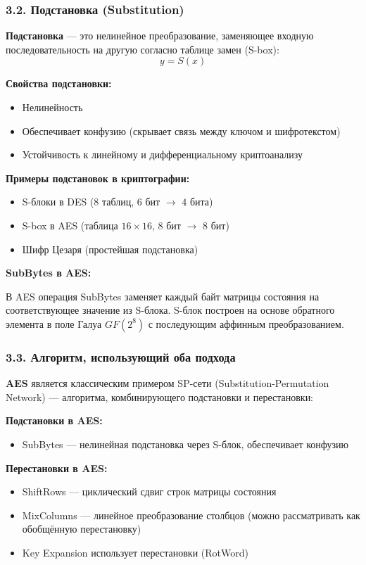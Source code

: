 \subsubsection*{3.2. Подстановка (Substitution)}

\textbf{Подстановка} — это нелинейное преобразование, заменяющее входную последовательность на другую согласно таблице замен (S-box):
$$y = S(x)$$

\textbf{Свойства подстановки:}
\begin{itemize}
    \item Нелинейность
    \item Обеспечивает конфузию (скрывает связь между ключом и шифротекстом)
    \item Устойчивость к линейному и дифференциальному криптоанализу
\end{itemize}

\textbf{Примеры подстановок в криптографии:}
\begin{itemize}
    \item S-блоки в DES (8 таблиц, $6$ бит $\rightarrow$ $4$ бита)
    \item S-box в AES (таблица $16 \times 16$, $8$ бит $\rightarrow$ $8$ бит)
    \item Шифр Цезаря (простейшая подстановка)
\end{itemize}

\textbf{SubBytes в AES:}

В AES операция SubBytes заменяет каждый байт матрицы состояния на соответствующее значение из S-блока. S-блок построен на основе обратного элемента в поле Галуа $GF(2^8)$ с последующим аффинным преобразованием.

\subsubsection*{3.3. Алгоритм, использующий оба подхода}

\textbf{AES} является классическим примером SP-сети (Substitution-Permutation Network) — алгоритма, комбинирующего подстановки и перестановки:

\textbf{Подстановки в AES:}
\begin{itemize}
    \item SubBytes — нелинейная подстановка через S-блок, обеспечивает конфузию
\end{itemize}

\textbf{Перестановки в AES:}
\begin{itemize}
    \item ShiftRows — циклический сдвиг строк матрицы состояния
    \item MixColumns — линейное преобразование столбцов (можно рассматривать как обобщённую перестановку)
    \item Key Expansion использует перестановки (RotWord)
\end{itemize}


